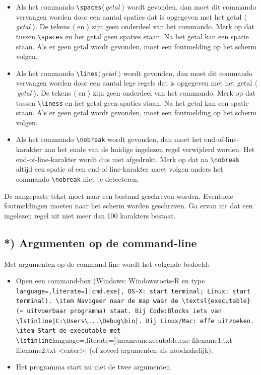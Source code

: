 \documentclass[a4paper,10pt,fleqn,twoside]{article}
\begin{document}
\begin{itemize}
\item Als het commando \lstinline|\spaces|$\langle$\,\textsl{getal} $\rangle$ wordt gevonden, dan moet dit commando vervangen worden door een aantal spaties dat is opgegeven met het getal $\langle$\,\textsl{getal} $\rangle$. De tekens $\langle$ en $\rangle$ zijn geen onderdeel van het commando. Merk op dat tussen \lstinline|\spaces| en het getal geen spaties staan. Na het getal kan een spatie staan. Als er geen getal wordt gevonden, moet een foutmelding op het scherm volgen.
\item Als het commando \lstinline|\lines|$\langle$\,\textsl{getal} $\rangle$ wordt gevonden, dan moet dit commando vervangen worden door een aantal lege regels dat is opgegeven met het getal $\langle$\,\textsl{getal} $\rangle$. De tekens $\langle$ en $\rangle$ zijn geen onderdeel van het commando. Merk op dat tussen \lstinline|\liness| en het getal geen spaties staan. Na het getal kan een spatie staan.  Als er geen getal wordt gevonden, moet een foutmelding op het scherm volgen.
\item Als het commando \lstinline|\nobreak| wordt gevonden, dan moet het end-of-line-karakter aan het einde van de huidige ingelezen regel verwijderd worden. Het end-of-line-karakter wordt dus niet afgedrukt. Merk op dat na \lstinline|\nobreak| altijd een spatie of een end-of-line-karakter moet volgen anders het commando \lstinline|\nobreak| niet te detecteren.
\end{itemize}

De aangepaste tekst moet naar een bestand geschreven worden. Eventuele foutmeldingen moeten naar het scherm worden geschreven. Ga ervan uit dat een ingelezen regel uit niet meer dan 100 karakters bestaat.


\subsection*{*) Argumenten op de command-line}
Met argumenten op de command-line wordt het volgende bedoeld:

\begin{itemize}
\item Open een command-box (Windows: Windowstoets-R en type \lstinline[language=,literate=]|cmd.exe|, OS-X: start terminal; Linux: start terminal).
\item Navigeer naar de map waar de \textsl{executable} (= uitvoerbaar programma) staat. Bij Code:Blocks iets van \lstinline|C:\Users\...\Debug\bin|. Bij Linux/Mac: effe uitzoeken.
\item Start de executable met \lstinline[language=,literate=]|naamvanexecutable.exe filename1.txt filename2.txt <enter>| (of zoveel argumenten als noodzakelijk).
\item Het programma start nu met de twee argumenten.
\end{itemize}
\end{document}
